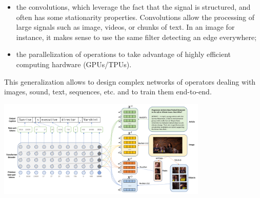 \documentclass[c,8pt]{beamer}
\begin{document}
\begin{frame}{}{}
{\begin{itemize}
  \item the convolutions, which leverage the fact that the signal is
    structured, and often has some stationarity
    properties. Convolutions allow the processing of large signals
    such as image, videos, or chunks of text. In an image for
    instance, it makes sense to use the same filter detecting an edge
    everywhere;

  \item the parallelization of operations to take advantage of highly
    efficient computing hardware (GPUs/TPUs).

  \end{itemize}

}

\end{frame}


\begin{frame}{}{}

This generalization allows to design complex networks of operators
dealing with images, sound, text, sequences, {etc.} and to train them
end-to-end.



\includegraphics[width=10cm]{pics/Tran_et_al_-_Transform_and_Tell_Entity-Aware_News_Image_Captioning_CVPR_2020_03.png}




\end{frame}
\end{document}
